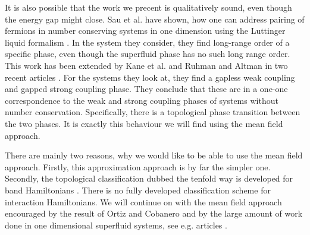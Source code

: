 It is also possible that the work we precent is qualitatively sound, even though the energy gap might close. Sau et al. have shown, how one can address pairing of fermions in number conserving systems in one dimension using the Luttinger liquid formalism \cite{Flensberg.numberconserving1Dfermions}. In the system they consider, they find long-range order of a specific phase, even though the superfluid phase has no such long range order. This work has been extended by Kane et al. and Ruhman and Altman in two recent articles \cite{Kane.Pairing.Luttingerliquids, Altman.Pairing.spinlessfermions}. For the systems they look at, they find a gapless weak coupling and gapped strong coupling phase. They conclude that these are in a one-one correspondence to the weak and strong coupling phases of systems without number conservation. Specifically, there is a topological phase transition between the two phases. It is exactly this behaviour we will find using the mean field approach.

There are mainly two reasons, why we would like to be able to use the mean field approach. Firstly, this approximation approach is by far the simpler one. Secondly, the topological classification dubbed the tenfold way is developed for band Hamiltonians \cite{Ryu.Topology}. There is no fully developed classification scheme for interaction Hamiltonians. We will continue on with the mean field approach encouraged by the result of Ortiz and Cobanero and by the large amount of work done in one dimensional superfluid systems, see e.g. articles \cite{Alicea, KitaevTopPhases, KitaevQuantumWires, LiYangChen, FuKane2006, GreiterIsingKitaevChain, DeGottardiMajoranaFermions, BudichTopInvMajoranaWires}. 

